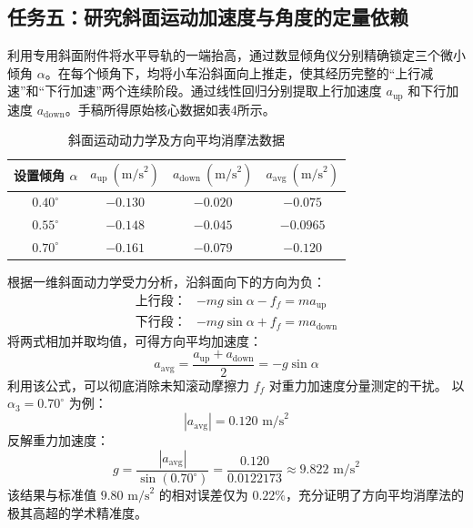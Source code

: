 \documentclass[twocolumn,zihao=5,a4paper]{ctexart} %
\begin{document}
	\subsection{任务五：研究斜面运动加速度与角度的定量依赖}
	利用专用斜面附件将水平导轨的一端抬高，通过数显倾角仪分别精确锁定三个微小倾角 $\alpha$。在每个倾角下，均将小车沿斜面向上推走，使其经历完整的“上行减速”和“下行加速”两个连续阶段。通过线性回归分别提取上行加速度 $a_{\text{up}}$ 和下行加速度 $a_{\text{down}}$。手稿所得原始核心数据如表4所示。
	
	\begin{table}[H]
		\centering
		\caption{斜面运动动力学及方向平均消摩法数据}
		\begin{tabular}{cccc}
			\toprule
			设置倾角 $\alpha$ & $a_{\text{up}}\ (\text{m/s}^2)$ & $a_{\text{down}}\ (\text{m/s}^2)$ & $a_{\text{avg}}\ (\text{m/s}^2)$ \\
			\midrule
			$0.40^\circ$ & $-0.130$ & $-0.020$ & $-0.075$ \\
			$0.55^\circ$ & $-0.148$ & $-0.045$ & $-0.0965$ \\
			$0.70^\circ$ & $-0.161$ & $-0.079$ & $-0.120$ \\
			\bottomrule
		\end{tabular}
	\end{table}
	
	根据一维斜面动力学受力分析，沿斜面向下的方向为负：
	\begin{align}
		\text{上行段：} & -mg\sin\alpha - f_f = ma_{\text{up}} \\
		\text{下行段：} & -mg\sin\alpha + f_f = ma_{\text{down}}
	\end{align}
	将两式相加并取均值，可得方向平均加速度：
	\begin{equation}
		a_{\text{avg}} = \frac{a_{\text{up}} + a_{\text{down}}}{2} = -g\sin\alpha
	\end{equation}
	利用该公式，可以彻底消除未知滚动摩擦力 $f_f$ 对重力加速度分量测定的干扰。
	以 $\alpha_3 = 0.70^\circ$ 为例：
	\begin{equation}
		|a_{\text{avg}}| = 0.120\text{ m/s}^2
	\end{equation}
	反解重力加速度：
	\begin{equation}
		g = \frac{|a_{\text{avg}}|}{\sin(0.70^\circ)} = \frac{0.120}{0.0122173} \approx 9.822\text{ m/s}^2
	\end{equation}
	该结果与标准值 $9.80\text{ m/s}^2$ 的相对误差仅为 $0.22\%$，充分证明了方向平均消摩法的极其高超的学术精准度。
	
\end{document}
